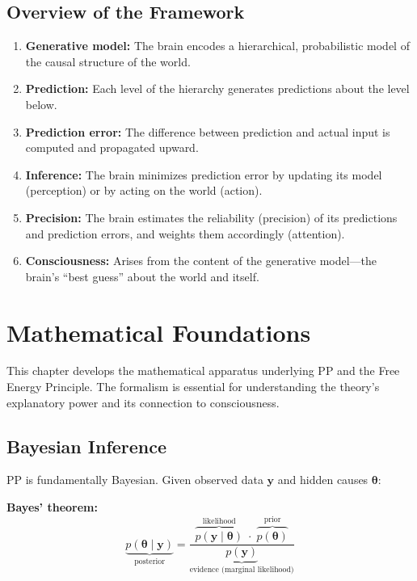 \documentclass[11pt,a4paper]{report}
\begin{document}
\section{Overview of the Framework}

\begin{enumerate}[leftmargin=2em]
  \item \textbf{Generative model:} The brain encodes a hierarchical, probabilistic model of the causal structure of the world.
  \item \textbf{Prediction:} Each level of the hierarchy generates predictions about the level below.
  \item \textbf{Prediction error:} The difference between prediction and actual input is computed and propagated upward.
  \item \textbf{Inference:} The brain minimizes prediction error by updating its model (perception) or by acting on the world (action).
  \item \textbf{Precision:} The brain estimates the reliability (precision) of its predictions and prediction errors, and weights them accordingly (attention).
  \item \textbf{Consciousness:} Arises from the content of the generative model---the brain's ``best guess'' about the world and itself.
\end{enumerate}


\chapter{Mathematical Foundations}

This chapter develops the mathematical apparatus underlying PP and the Free Energy Principle. The formalism is essential for understanding the theory's explanatory power and its connection to consciousness.

\section{Bayesian Inference}

PP is fundamentally Bayesian. Given observed data $\mathbf{y}$ and hidden causes $\boldsymbol{\theta}$:

\begin{mathbox}
\vspace{-6pt}
\textbf{Bayes' theorem:}
\[
  \underbrace{p(\boldsymbol{\theta} \mid \mathbf{y})}_{\text{posterior}} = \frac{\overbrace{p(\mathbf{y} \mid \boldsymbol{\theta})}^{\text{likelihood}} \;\cdot\; \overbrace{p(\boldsymbol{\theta})}^{\text{prior}}}{\underbrace{p(\mathbf{y})}_{\text{evidence (marginal likelihood)}}}
\]
\vspace{-8pt}
\end{mathbox}
\end{document}
